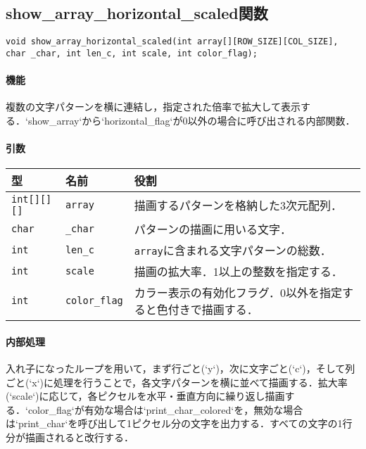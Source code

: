 \documentclass[uplatex]{jsarticle}
\begin{document}
\subsection{show\_array\_horizontal\_scaled関数}
\begin{verbatim}
void show_array_horizontal_scaled(int array[][ROW_SIZE][COL_SIZE], char _char, int len_c, int scale, int color_flag);
\end{verbatim}
\paragraph{機能}
複数の文字パターンを横に連結し，指定された倍率で拡大して表示する．`show\_array`から`horizontal\_flag`が0以外の場合に呼び出される内部関数．

\paragraph{引数}
\begin{center}
    \begin{tabular}{|l|l|p{7cm}|}
        \hline
        \textbf{型} & \textbf{名前} & \textbf{役割} \\ \hline
        \texttt{int[][][]} & \texttt{array} & 描画するパターンを格納した3次元配列． \\ \hline
        \texttt{char} & \texttt{\_char} & パターンの描画に用いる文字． \\ \hline
        \texttt{int} & \texttt{len\_c} & \texttt{array}に含まれる文字パターンの総数． \\ \hline
        \texttt{int} & \texttt{scale} & 描画の拡大率．1以上の整数を指定する． \\ \hline
        \texttt{int} & \texttt{color\_flag} & カラー表示の有効化フラグ．0以外を指定すると色付きで描画する． \\ \hline
    \end{tabular}
\end{center}

\paragraph{内部処理}
入れ子になったループを用いて，まず行ごと(`y`)，次に文字ごと(`c`)，そして列ごと(`x`)に処理を行うことで，各文字パターンを横に並べて描画する．拡大率(`scale`)に応じて，各ピクセルを水平・垂直方向に繰り返し描画する．`color\_flag`が有効な場合は`print\_char\_colored`を，無効な場合は`print\_char`を呼び出して1ピクセル分の文字を出力する．すべての文字の1行分が描画されると改行する．
\end{document}
